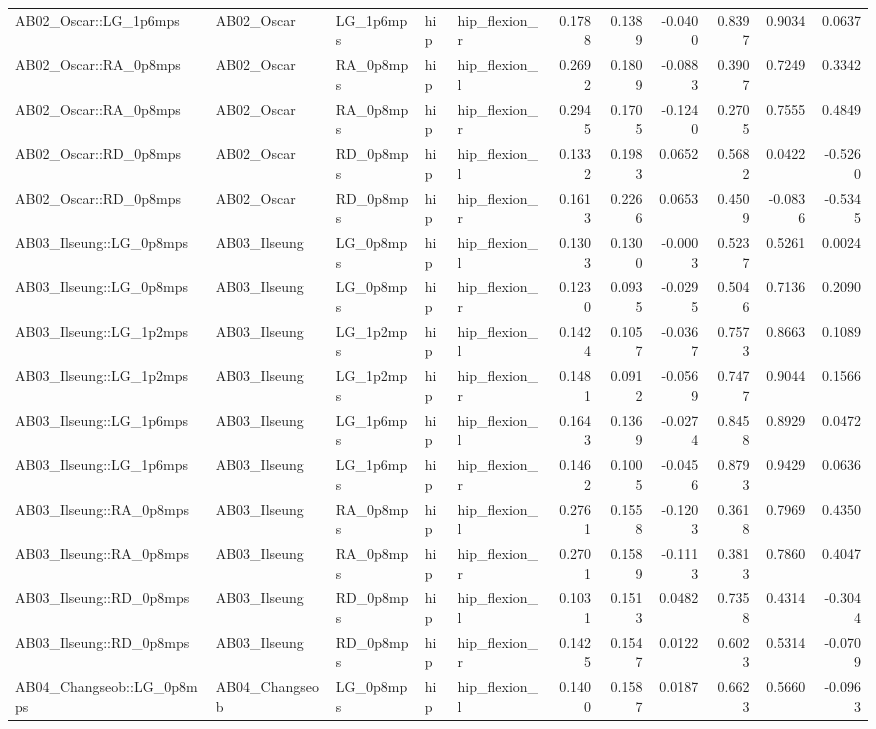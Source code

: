 \begin{table}
\begin{tabular}{lllllrrrrrr}
AB02_Oscar::LG_1p6mps & AB02_Oscar & LG_1p6mps & hip & hip_flexion_r & 0.1788 & 0.1389 & -0.0400 & 0.8397 & 0.9034 & 0.0637 \\
AB02_Oscar::RA_0p8mps & AB02_Oscar & RA_0p8mps & hip & hip_flexion_l & 0.2692 & 0.1809 & -0.0883 & 0.3907 & 0.7249 & 0.3342 \\
AB02_Oscar::RA_0p8mps & AB02_Oscar & RA_0p8mps & hip & hip_flexion_r & 0.2945 & 0.1705 & -0.1240 & 0.2705 & 0.7555 & 0.4849 \\
AB02_Oscar::RD_0p8mps & AB02_Oscar & RD_0p8mps & hip & hip_flexion_l & 0.1332 & 0.1983 & 0.0652 & 0.5682 & 0.0422 & -0.5260 \\
AB02_Oscar::RD_0p8mps & AB02_Oscar & RD_0p8mps & hip & hip_flexion_r & 0.1613 & 0.2266 & 0.0653 & 0.4509 & -0.0836 & -0.5345 \\
AB03_Ilseung::LG_0p8mps & AB03_Ilseung & LG_0p8mps & hip & hip_flexion_l & 0.1303 & 0.1300 & -0.0003 & 0.5237 & 0.5261 & 0.0024 \\
AB03_Ilseung::LG_0p8mps & AB03_Ilseung & LG_0p8mps & hip & hip_flexion_r & 0.1230 & 0.0935 & -0.0295 & 0.5046 & 0.7136 & 0.2090 \\
AB03_Ilseung::LG_1p2mps & AB03_Ilseung & LG_1p2mps & hip & hip_flexion_l & 0.1424 & 0.1057 & -0.0367 & 0.7573 & 0.8663 & 0.1089 \\
AB03_Ilseung::LG_1p2mps & AB03_Ilseung & LG_1p2mps & hip & hip_flexion_r & 0.1481 & 0.0912 & -0.0569 & 0.7477 & 0.9044 & 0.1566 \\
AB03_Ilseung::LG_1p6mps & AB03_Ilseung & LG_1p6mps & hip & hip_flexion_l & 0.1643 & 0.1369 & -0.0274 & 0.8458 & 0.8929 & 0.0472 \\
AB03_Ilseung::LG_1p6mps & AB03_Ilseung & LG_1p6mps & hip & hip_flexion_r & 0.1462 & 0.1005 & -0.0456 & 0.8793 & 0.9429 & 0.0636 \\
AB03_Ilseung::RA_0p8mps & AB03_Ilseung & RA_0p8mps & hip & hip_flexion_l & 0.2761 & 0.1558 & -0.1203 & 0.3618 & 0.7969 & 0.4350 \\
AB03_Ilseung::RA_0p8mps & AB03_Ilseung & RA_0p8mps & hip & hip_flexion_r & 0.2701 & 0.1589 & -0.1113 & 0.3813 & 0.7860 & 0.4047 \\
AB03_Ilseung::RD_0p8mps & AB03_Ilseung & RD_0p8mps & hip & hip_flexion_l & 0.1031 & 0.1513 & 0.0482 & 0.7358 & 0.4314 & -0.3044 \\
AB03_Ilseung::RD_0p8mps & AB03_Ilseung & RD_0p8mps & hip & hip_flexion_r & 0.1425 & 0.1547 & 0.0122 & 0.6023 & 0.5314 & -0.0709 \\
AB04_Changseob::LG_0p8mps & AB04_Changseob & LG_0p8mps & hip & hip_flexion_l & 0.1400 & 0.1587 & 0.0187 & 0.6623 & 0.5660 & -0.0963 \\

\end{tabular}
\end{table}
